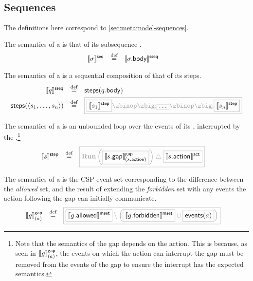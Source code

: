 \subsection{Sequences}\label{ssec:semantics-tockcsp-sequences}

The definitions here correspond to \cref{sec:metamodel-sequences}.

\begin{defn}[\msequence]

The semantics of a \msequence{} is that of its subsequence
.
%
\begin{align*}
	\llbracket \sigma \rrbracket^{\mathsf{seq}}
\quad\mathbin{\overset{\text{def}}=}\quad&	
	\llbracket \sigma.\mathsf{body} \rrbracket^{\mathsf{sseq}}
\end{align*}

\end{defn}

\begin{defn}[\msubsequence]

The semantics of a \msubsequence{} is a sequential composition of that of its steps.
%
\begin{align*}
	\sseqsema{\asseq}
	\quad\defeq\quad&	
	\funcname{steps}(\field{\asseq}{body})
\\
	\funcname{steps}(\langle \astep_1, \dotsc, \astep_n \rangle)
	\quad\defeq\quad&	
	\tlang{
	\olang{\stepsema{\astep_1}}
	\circseq
	\olang{\dotso}
	\circseq
	\olang{\stepsema{\astep_n}}
	}
\end{align*}

\end{defn}

\begin{defn}[\msequencestep]

The semantics of a \msequencestep{} is an unbounded loop over the events of its
\msequencegap, interrupted by the \msequenceaction.\footnote{Note that the semantics of the gap depends
on the action.  This is because, as seen in \(\llbracket g \rrbracket^{\mathsf{gap}}_{(a)}\),
the events on which the action can interrupt the
gap must be removed from the events of the gap to ensure the interrupt has the
expected semantics.}
%
\begin{align*}
	\stepsema{\astep}
\quad\defeq\quad&	
	\tlang{
		\runproc{\olang{\gapsema{\field{\astep}{gap}}{\field{\astep}{action}}}}
		\interrupt \olang{\actsema{\field{\astep}{action}}}
	}
\end{align*}
\end{defn}

\begin{defn}[\msequencegap]
	The semantics of a \msequencegap{} is the CSP event set corresponding to
	the difference between the \emph{allowed} set,
	and the result of extending the \emph{forbidden} set with any events
	the action following the gap can initially communicate.
%
\begin{align*}
	\gapsema{
		\agap
	}{\anaction}
\quad\defeq\quad&
\tlang{
	\olang{\msgsetsema{\field{\agap}{allowed}}}
	\setminus
	\left(
		\olang{\msgsetsema{\field{\agap}{forbidden}}}
		\cup
		\olang{\eventsOf{\anaction}}
	\right)
}
\end{align*}
\end{defn}

